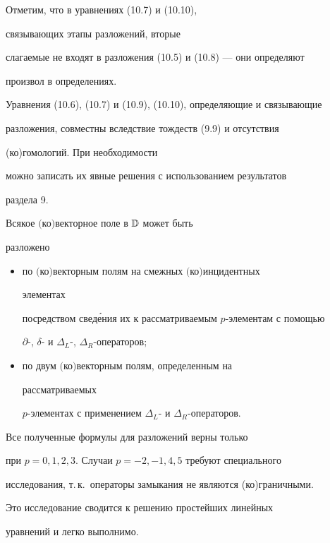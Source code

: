 Отметим, что в уравнениях (10.7) и (10.10), 


связывающих этапы разложений, вторые  


слагаемые не входят в разложения (10.5) и (10.8) --- они определяют 


произвол в определениях. 


 


Уравнения (10.6), (10.7) и (10.9), (10.10), определяющие и связывающие 


разложения, совместны вследствие тождеств (9.9) и отсутствия 


(ко)гомологий. При необходимости  


можно записать их явные решения с использованием результатов 


раздела 9. 


 


\begin{prop} Всякое $($ко$)$векторное поле в $\Bbb D$ может быть 


разложено 


\begin{itemize} 


\item[(1)] по $($ко$)$векторным полям на смежных $($ко$)$инцидентных 


элементах  


посредством свед\'ения их к рассматриваемым $p$-элементам с помощью  


$\partial$-, $\delta$- и $\Delta_L$-, $\Delta_R$-операторов$;$ 


\item[(2)] по двум $($ко$)$векторным полям, определенным на 


рассматриваемых  


$p$-элементах с применением $\Delta_L$- и $\Delta_R$-операторов. 


\end{itemize} 


\end{prop} 


\setcounter{note}{3} 


 


\begin{note} Все полученные формулы для разложений верны только 


при $p=0,1,2,3$. Случаи $p=-2,-1,4,5$ требуют специального 


исследования, т.\,к.~операторы замыкания не являются (ко)граничными. 


Это исследование сводится к решению простейших линейных  


уравнений и легко выполнимо. 


\end{note} 


